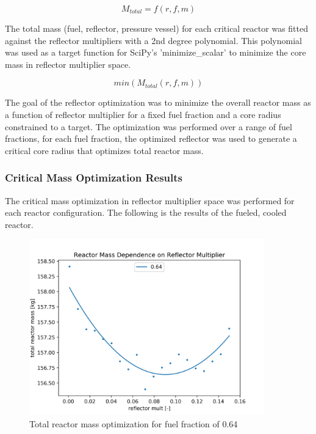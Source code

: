 \begin{equation}
    M_{total} = f(r, f, m)
\end{equation}

The total mass (fuel, reflector, pressure vessel) for each critical
reactor was fitted against the reflector multipliers with a 2nd degree
polynomial. This polynomial was used as a target function for SciPy's
'minimize\_scalar' to minimize the core mass in reflector multiplier space.

\begin{equation}
    min( M_{total}(r, f, m) )
\end{equation}

The goal of the reflector optimization was to minimize the overall reactor mass
as a function of reflector multiplier for a fixed fuel fraction and a core
radius constrained to a \keff target. The optimization was performed over a range
of fuel fractions, for each fuel fraction, the optimized reflector was used to
generate a critical core radius that optimizes total reactor mass.


\subsubsection{Critical Mass Optimization Results}

The critical mass optimization in reflector multiplier space was performed for
each reactor configuration. The following is the results of the \uox fueled,
\codiox cooled reactor.

\begin{figure}[h]
    \centering
    \includegraphics[width=4in]{../images/mass_mult_064.png}
\caption{Total reactor mass optimization for fuel fraction of 0.64}
\label{fig:mass_mult_one}
\end{figure}


